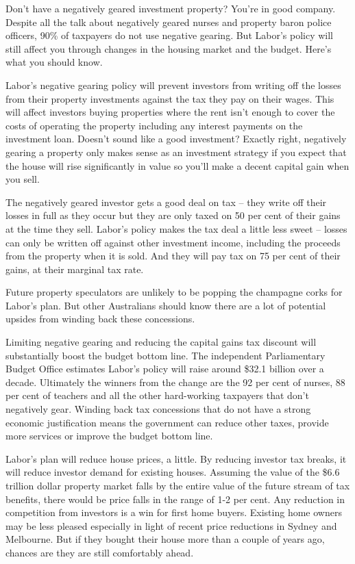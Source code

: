 \documentclass[]{article}
\date{}
\begin{document}
Don't have a negatively geared investment property? You're in good
company. Despite all the talk about negatively geared nurses and
property baron police officers, 90\% of taxpayers do not use negative
gearing. But Labor's policy will still affect you through changes in the
housing market and the budget. Here's what you should know.

Labor's negative gearing policy will prevent investors from writing off
the losses from their property investments against the tax they pay on
their wages. This will affect investors buying properties where the rent
isn't enough to cover the costs of operating the property including any
interest payments on the investment loan. Doesn't sound like a good
investment? Exactly right, negatively gearing a property only makes
sense as an investment strategy if you expect that the house will rise
significantly in value so you'll make a decent capital gain when you
sell.

The negatively geared investor gets a good deal on tax -- they write off
their losses in full as they occur but they are only taxed on 50 per
cent of their gains at the time they sell. Labor's policy makes the tax
deal a little less sweet -- losses can only be written off against other
investment income, including the proceeds from the property when it is
sold. And they will pay tax on 75 per cent of their gains, at their
marginal tax rate.

Future property speculators are unlikely to be popping the champagne
corks for Labor's plan. But other Australians should know there are a
lot of potential upsides from winding back these concessions.

Limiting negative gearing and reducing the capital gains tax discount
will substantially boost the budget bottom line. The independent
Parliamentary Budget Office estimates Labor's policy will raise around
\$32.1 billion over a decade. Ultimately the winners from the change are
the 92 per cent of nurses, 88 per cent of teachers and all the other
hard-working taxpayers that don't negatively gear. Winding back tax
concessions that do not have a strong economic justification means the
government can reduce other taxes, provide more services or improve the
budget bottom line.

Labor's plan will reduce house prices, a little. By reducing investor
tax breaks, it will reduce investor demand for existing houses. Assuming
the value of the \$6.6 trillion dollar property market falls by the
entire value of the future stream of tax benefits, there would be price
falls in the range of 1-2 per cent. Any reduction in competition from
investors is a win for first home buyers. Existing home owners may be
less pleased especially in light of recent price reductions in Sydney
and Melbourne. But if they bought their house more than a couple of
years ago, chances are they are still comfortably ahead.
\end{document}
